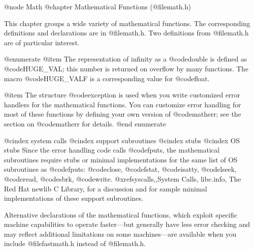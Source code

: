 @node Math
@chapter Mathematical Functions (@file{math.h})

This chapter groups a wide variety of mathematical functions.  The
corresponding definitions and declarations are in @file{math.h}.
Two definitions from @file{math.h} are of particular interest.

@enumerate
@item
The representation of infinity as a @code{double} is defined as
@code{HUGE_VAL}; this number is returned on overflow by many functions.
The macro @code{HUGE_VALF} is a corresponding value for @code{float}.

@item
The structure @code{exception} is used when you write customized error
handlers for the mathematical functions.  You can customize error
handling for most of these functions by defining your own version of
@code{matherr}; see the section on @code{matherr} for details.
@end enumerate

@cindex system calls
@cindex support subroutines
@cindex stubs
@cindex OS stubs
Since the error handling code calls @code{fputs}, the mathematical
subroutines require stubs or minimal implementations for the same list
of OS subroutines as @code{fputs}: @code{close}, @code{fstat},
@code{isatty}, @code{lseek}, @code{read}, @code{sbrk}, @code{write}.
@xref{syscalls,,System Calls, libc.info, The Red Hat newlib C Library},
for a discussion and for sample minimal implementations of these support
subroutines.

Alternative declarations of the mathematical functions, which exploit
specific machine capabilities to operate faster---but generally have
less error checking and may reflect additional limitations on some
machines---are available when you include @file{fastmath.h} instead of
@file{math.h}.

